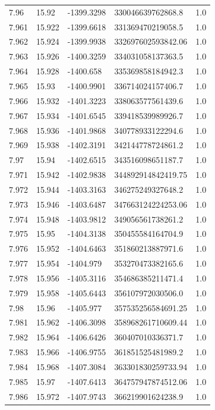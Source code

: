\begin{tabular}{lllll}
7.96 & 15.92 & -1399.3298 & 330046639762868.8 & 1.0 \\
7.961 & 15.922 & -1399.6618 & 331369470219058.5 & 1.0 \\
7.962 & 15.924 & -1399.9938 & 332697602593842.06 & 1.0 \\
7.963 & 15.926 & -1400.3259 & 334031058137363.5 & 1.0 \\
7.964 & 15.928 & -1400.658 & 335369858184942.3 & 1.0 \\
7.965 & 15.93 & -1400.9901 & 336714024157406.7 & 1.0 \\
7.966 & 15.932 & -1401.3223 & 338063577561439.6 & 1.0 \\
7.967 & 15.934 & -1401.6545 & 339418539989926.7 & 1.0 \\
7.968 & 15.936 & -1401.9868 & 340778933122294.6 & 1.0 \\
7.969 & 15.938 & -1402.3191 & 342144778724861.2 & 1.0 \\
7.97 & 15.94 & -1402.6515 & 343516098651187.7 & 1.0 \\
7.971 & 15.942 & -1402.9838 & 344892914842419.75 & 1.0 \\
7.972 & 15.944 & -1403.3163 & 346275249327648.2 & 1.0 \\
7.973 & 15.946 & -1403.6487 & 347663124224253.06 & 1.0 \\
7.974 & 15.948 & -1403.9812 & 349056561738261.2 & 1.0 \\
7.975 & 15.95 & -1404.3138 & 350455584164704.9 & 1.0 \\
7.976 & 15.952 & -1404.6463 & 351860213887971.6 & 1.0 \\
7.977 & 15.954 & -1404.979 & 353270473382165.6 & 1.0 \\
7.978 & 15.956 & -1405.3116 & 354686385211471.4 & 1.0 \\
7.979 & 15.958 & -1405.6443 & 356107972030506.0 & 1.0 \\
7.98 & 15.96 & -1405.977 & 357535256584691.25 & 1.0 \\
7.981 & 15.962 & -1406.3098 & 358968261710609.44 & 1.0 \\
7.982 & 15.964 & -1406.6426 & 360407010336371.7 & 1.0 \\
7.983 & 15.966 & -1406.9755 & 361851525481989.2 & 1.0 \\
7.984 & 15.968 & -1407.3084 & 363301830259733.94 & 1.0 \\
7.985 & 15.97 & -1407.6413 & 364757947874512.06 & 1.0 \\
7.986 & 15.972 & -1407.9743 & 366219901624238.9 & 1.0 \\

\end{tabular}
